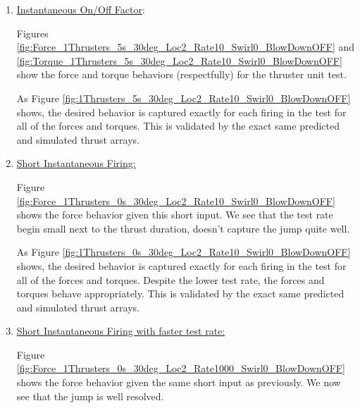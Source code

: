 \begin{enumerate}
	\item{\underline{ Instantaneous On/Off Factor}:}

	

	Figures \ref{fig:Force_1Thrusters_5s_30deg_Loc2_Rate10_Swirl0_BlowDownOFF} and \ref{fig:Torque_1Thrusters_5s_30deg_Loc2_Rate10_Swirl0_BlowDownOFF} show the force and torque behaviors (respectfully) for the thruster unit test.

	
	
	

	As Figure \ref{fig:1Thrusters_5s_30deg_Loc2_Rate10_Swirl0_BlowDownOFF} shows, the desired behavior is captured exactly for each
	firing in the test for all of the forces and torques. This is validated by the exact same predicted and simulated thrust arrays.

	\item{\underline{Short Instantaneous Firing: }}

	

	Figure \ref{fig:Force_1Thrusters_0s_30deg_Loc2_Rate10_Swirl0_BlowDownOFF} shows the force behavior given this short input. We see that the test rate begin small next to the thrust duration, doesn't capture the jump quite well.

	
	

	As Figure \ref{fig:1Thrusters_0s_30deg_Loc2_Rate10_Swirl0_BlowDownOFF} shows, the desired behavior is captured exactly for each
	firing in the test for all of the forces and torques. Despite the lower test rate, the forces and torques behave appropriately. This is validated by the exact same predicted and simulated thrust arrays.

	\item{\underline{Short Instantaneous Firing with faster test rate: }}

	

	Figure \ref{fig:Force_1Thrusters_0s_30deg_Loc2_Rate1000_Swirl0_BlowDownOFF} shows the force behavior given the same short input as previously. We now see that the jump is well resolved.


\end{enumerate}
